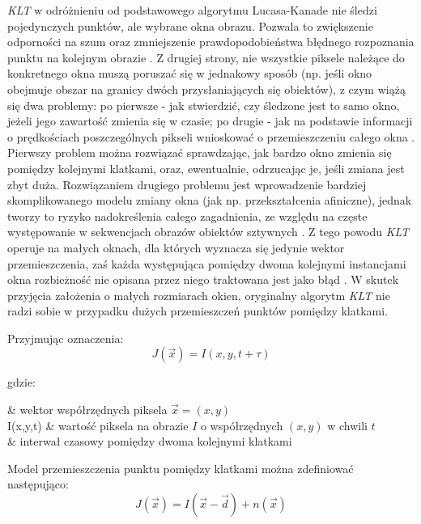 \textit{KLT} w odróżnieniu od podstawowego algorytmu Lucasa-Kanade nie śledzi pojedynczych punktów, ale wybrane okna obrazu. Pozwala to zwiększenie odporności na szum oraz zmniejszenie prawdopodobieństwa błędnego rozpoznania punktu na kolejnym obrazie \cite{Tomasi1991}. Z drugiej strony, nie wszystkie piksele należące do konkretnego okna muszą poruszać się w jednakowy sposób (np. jeśli  okno obejmuje obszar na granicy dwóch przysłaniających się obiektów), z czym wiążą się dwa problemy: po pierwsze - jak stwierdzić, czy śledzone jest to samo okno, jeżeli jego zawartość zmienia się w czasie; po drugie - jak na podstawie informacji o prędkościach poszczególnych pikseli wnioskować o przemieszczeniu całego okna \cite{Tomasi1991}. Pierwszy problem można rozwiązać sprawdzając, jak bardzo okno zmienia się pomiędzy kolejnymi klatkami, oraz, ewentualnie, odrzucając je, jeśli zmiana jest zbyt duża. Rozwiązaniem drugiego problemu jest wprowadzenie bardziej skomplikowanego modelu zmiany okna (jak np. przekształcenia afiniczne), jednak tworzy to ryzyko nadokreślenia całego zagadnienia, ze względu na częste występowanie w sekwencjach obrazów obiektów sztywnych \cite{Tomasi1991}. Z tego powodu \textit{KLT} operuje na małych oknach, dla których wyznacza się jedynie wektor przemieszczenia, zaś każda występująca pomiędzy dwoma kolejnymi instancjami okna rozbieżność nie opisana przez niego traktowana jest jako błąd \cite{Tomasi1991}. W skutek przyjęcia założenia o małych rozmiarach okien, oryginalny algorytm \textit{KLT} nie radzi sobie w przypadku dużych przemieszczeń punktów pomiędzy klatkami. 

Przyjmując oznaczenia:
\begin{equation}
\label{equ:Algorytm_Lucasa_Kanade_Tomasi_oznaczenia}
	J(\vec{x}) = I(x, y, t + \tau)
\end{equation}

\noindent
gdzie:
\begin{conditions}
	 & wektor współrzędnych piksela $\vec{x} = (x, y)$ \\
	I(x,y,t) & wartość piksela na obrazie $I$ o współrzędnych $(x,y)$ w chwili $t$ \\
	\tau & interwał czasowy pomiędzy dwoma kolejnymi klatkami \\
\end{conditions}

Model przemieszczenia punktu pomiędzy klatkami można zdefiniować następująco:
\begin{equation}
\label{equ:Algorytm_Lucasa_Kanade_Tomasi_model}
	J(\vec{x}) = I(\vec{x} - \vec{d}) + n(\vec{x})
\end{equation}

